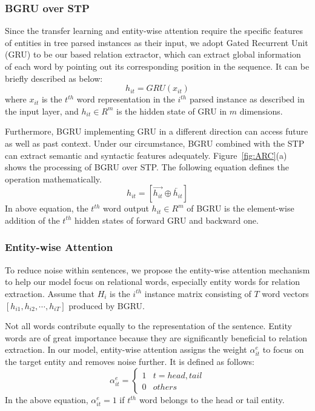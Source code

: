 \documentclass[11pt,a4paper]{article}
\begin{document}
  \subsubsection*{BGRU over STP}
  Since the transfer learning and entity-wise attention require the specific features of entities in tree parsed instances as their input, we adopt Gated Recurrent Unit (GRU) \citep{cho2014learning} to be our based relation extractor, which can extract global information of each word by pointing out its corresponding position in the sequence. It can be briefly described as below:
  \begin{equation}
    h_{it}=GRU(x_{it})
  \end{equation}
  where $x_{it}$ is the $t^{th}$ word representation in the $i^{th}$ parsed instance as described in the input layer, and $h_{it} \in R^m$ is the hidden state of GRU in $m$ dimensions.
  
  Furthermore, BGRU implementing GRU in a different direction can access future as well as past context. Under our circumstance, BGRU combined with the STP can extract semantic and syntactic features adequately. Figure~\ref{fig:ARC}(a) shows the processing of BGRU over STP. The following equation defines the operation mathematically.
  \begin{equation}
    h_{it}=[\overrightarrow{h_{it}} \oplus \overleftarrow{h_{it}}]
  \end{equation}
  In above equation, the $t^{th}$ word output $h_{it} \in R^{m}$ of BGRU is the element-wise addition of the $t^{th}$ hidden states of forward GRU and backward one.

  \subsubsection*{Entity-wise Attention}
  To reduce noise within sentences, we propose the entity-wise attention mechanism to help our model focus on relational words, especially entity words for relation extraction. Assume that $H_i$ is the $i^{th}$ instance matrix consisting of $T$ word vectors $[h_{i1},h_{i2},\cdots,h_{iT}]$ produced by BGRU.

  Not all words contribute equally to the representation of the sentence. Entity words are of great importance because they are significantly beneficial to relation extraction. In our model, entity-wise attention assigns the weight $\alpha_{it}^e$ to focus on the target entity and removes noise further. It is defined as follows:
  \begin{equation}
    \alpha_{it}^e=\begin{cases}
      1 & t=head,tail \\
      0 & others
    \end{cases}  
  \end{equation}
  In the above equation, $\alpha_{it}^e=1$ if $t^{th}$ word belongs to the head or tail entity.
\end{document}
